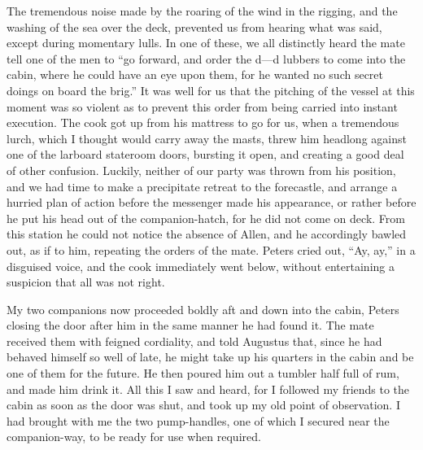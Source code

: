 The tremendous noise made by the roaring of the wind in the rigging, and the
washing of the sea over the deck, prevented us from hearing what was said,
except during momentary lulls. In one of these, we all distinctly heard the mate
tell one of the men to ``go forward, and order the d---d lubbers to come into the
cabin, where he could have an eye upon them, for he wanted no such secret doings
on board the brig.'' It was well for us that the pitching of the vessel at this
moment was so violent as to prevent this order from being carried into instant
execution. The cook got up from his mattress to go for us, when a tremendous
lurch, which I thought would carry away the masts, threw him headlong against
one of the larboard stateroom doors, bursting it open, and creating a good deal
of other confusion. Luckily, neither of our party was thrown from his position,
and we had time to make a precipitate retreat to the forecastle, and arrange a
hurried plan of action before the messenger made his appearance, or rather
before he put his head out of the companion-hatch, for he did not come on deck.
From this station he could not notice the absence of Allen, and he accordingly
bawled out, as if to him, repeating the orders of the mate. Peters cried out,
``Ay, ay,'' in a disguised voice, and the cook immediately went below, without
entertaining a suspicion that all was not right. 

My two companions now proceeded boldly aft and down into the cabin, Peters
closing the door after him in the same manner he had found it. The mate received
them with feigned cordiality, and told Augustus that, since he had behaved
himself so well of late, he might take up his quarters in the cabin and be one
of them for the future. He then poured him out a tumbler half full of rum, and
made him drink it. All this I saw and heard, for I followed my friends to the
cabin as soon as the door was shut, and took up my old point of observation. I
had brought with me the two pump-handles, one of which I secured near the
companion-way, to be ready for use when required. 

